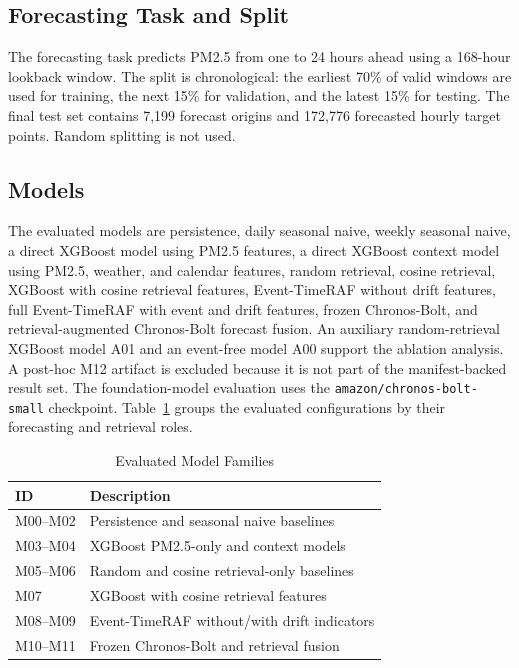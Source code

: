 \subsection{Forecasting Task and Split}
The forecasting task predicts PM2.5 from one to 24 hours ahead using a 168-hour
lookback window. The split is chronological: the earliest 70\% of valid windows
are used for training, the next 15\% for validation, and the latest 15\% for
testing. The final test set contains 7,199 forecast origins and 172,776
forecasted hourly target points. Random splitting is not used.

\subsection{Models}
The evaluated models are persistence, daily seasonal naive, weekly seasonal
naive, a direct XGBoost model using PM2.5 features, a direct XGBoost context
model using PM2.5, weather, and calendar features, random retrieval, cosine
retrieval, XGBoost with cosine retrieval features, Event-TimeRAF without drift
features, full Event-TimeRAF with event and drift features, frozen Chronos-Bolt,
and retrieval-augmented Chronos-Bolt forecast fusion. An auxiliary
random-retrieval XGBoost model A01 and an event-free model A00 support the
ablation analysis. A post-hoc M12 artifact is excluded because it is not part
of the manifest-backed result set. The foundation-model evaluation uses the
\texttt{amazon/chronos-bolt-small} checkpoint.
Table~\ref{tab:model_families} groups the evaluated configurations by their
forecasting and retrieval roles.

\begin{table}[!t]
\centering
\caption{Evaluated Model Families}
\label{tab:model_families}
\begin{tabular}{ll}
\toprule
ID & Description \\
\midrule
M00--M02 & Persistence and seasonal naive baselines \\
M03--M04 & XGBoost PM2.5-only and context models \\
M05--M06 & Random and cosine retrieval-only baselines \\
M07 & XGBoost with cosine retrieval features \\
M08--M09 & Event-TimeRAF without/with drift indicators \\
M10--M11 & Frozen Chronos-Bolt and retrieval fusion \\
\bottomrule
\end{tabular}
\end{table}

